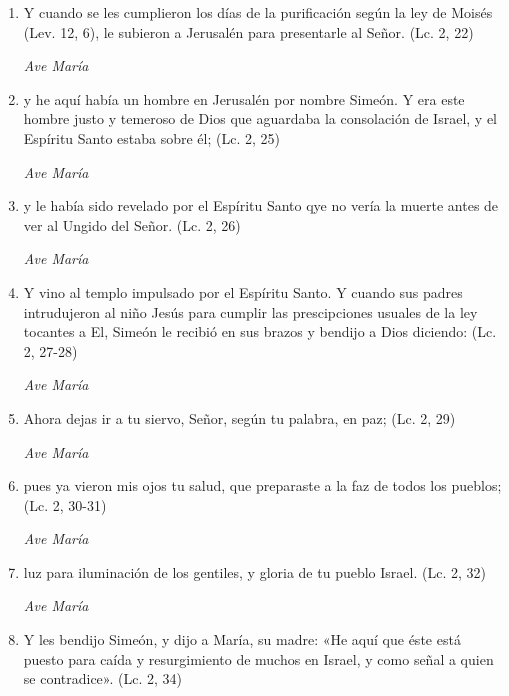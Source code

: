 \documentclass[a4paper,11pt, oneside]{report}
\begin{document}
      \begin{enumerate}
        
        \item Y cuando se les cumplieron los días de la purificación según la ley de Moisés (Lev. 12, 6), 
        le subieron a Jerusalén para presentarle al Señor. (Lc. 2, 22)
        
        \textit{Ave María}

        \item y he aquí había un hombre en Jerusalén por nombre Simeón. Y era este hombre justo y temeroso de Dios que aguardaba la consolación de Israel, 
        y el Espíritu Santo estaba sobre él; (Lc. 2, 25)
        
        \textit{Ave María}

        \item y le había sido revelado por el Espíritu Santo qye no vería la muerte antes de ver al Ungido del Señor. (Lc. 2, 26)
        
        \textit{Ave María}

        \item Y vino al templo impulsado por el Espíritu Santo. Y cuando sus padres intrudujeron al niño Jesús para cumplir las prescipciones usuales
        de la ley tocantes a El, Simeón le recibió en sus brazos y bendijo a Dios diciendo: (Lc. 2, 27-28)
        
        \textit{Ave María}

        \item Ahora dejas ir a tu siervo, Señor, según tu palabra, en paz; (Lc. 2, 29)

        \textit{Ave María}

        \item pues ya vieron mis ojos tu salud, que preparaste a la faz de todos los pueblos; (Lc. 2, 30-31)
        
        \textit{Ave María}

        \item luz para iluminación de los gentiles, y gloria de tu pueblo Israel. (Lc. 2, 32)
        
        \textit{Ave María}

        \item Y les bendijo Simeón, y dijo a María, su madre: «He aquí que éste está puesto para caída y resurgimiento de muchos en Israel, y como
        señal a quien se contradice». (Lc. 2, 34)
        

\end{enumerate}
\end{document}
